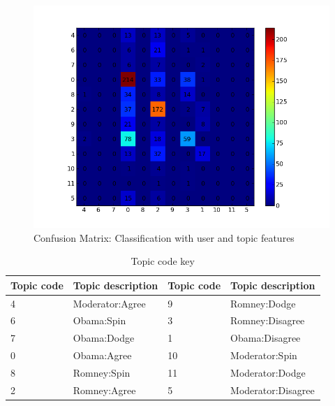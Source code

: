 \documentclass[12pt]{article}
\begin{document}
\begin{figure}[H]
	\centering
	\includegraphics[scale=0.5]{Figures/boydstun_confusion.png}
	\caption{Confusion Matrix: Classification with user and topic features}
	\label{fig:boydstunconfusion}
\end{figure}


\begin{table}[H]
\begin{centering}
\begin{tabular}{ l | l | l | l }
 Topic code & Topic description & Topic code & Topic description \\
\hline
4 & Moderator:Agree & 9 & Romney:Dodge \\
6 & Obama:Spin & 3 & Romney:Disagree \\
7 & Obama:Dodge & 1 & Obama:Disagree \\
0 & Obama:Agree & 10 & Moderator:Spin \\
8 & Romney:Spin & 11 & Moderator:Dodge \\
2 & Romney:Agree & 5 & Moderator:Disagree \\

\end{tabular}
\caption{Topic code key}
\end{centering}
\end{table}
\end{document}
